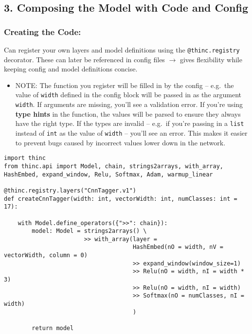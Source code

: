 \documentclass[
]{article}
\providecommand{\tightlist}{%
  \setlength{\itemsep}{0pt}\setlength{\parskip}{0pt}}
\begin{document}
\hypertarget{composing-the-model-with-code-and-config}{%
\subsection{3. Composing the Model with Code and
Config}\label{composing-the-model-with-code-and-config}}

\hypertarget{creating-the-code}{%
\subsubsection{Creating the Code:}\label{creating-the-code}}

Can register your own layers and model definitions using the
\texttt{@thinc.registry} decorator. These can later be
referenced in config files \(\rightarrow\) gives flexibility while
keeping config and model definitions concise.

\begin{itemize}
\tightlist
\item
  NOTE: The function you register will be filled in by the config --
  e.g.~the value of \texttt{width} defined in the config
  block will be passed in as the argument \texttt{width}.
  If arguments are missing, you'll see a validation error. If you're
  using \textbf{type hints} in the function, the values will be parsed
  to ensure they always have the right type. If the types are invalid --
  e.g.~if you're passing in a \texttt{list} instead of
  \texttt{int} as the value of
  \texttt{width} -- you'll see an error. This makes it
  easier to prevent bugs caused by incorrect values lower down in the
  network.
\end{itemize}

\begin{verbatim}
import thinc
from thinc.api import Model, chain, strings2arrays, with_array, HashEmbed, expand_window, Relu, Softmax, Adam, warmup_linear

@thinc.registry.layers("CnnTagger.v1")
def createCnnTagger(width: int, vectorWidth: int, numClasses: int = 17):

    with Model.define_operators({">>": chain}):
        model: Model = strings2arrays() \
                       >> with_array(layer =
                                     HashEmbed(nO = width, nV = vectorWidth, column = 0)
                                     >> expand_window(window_size=1)
                                     >> Relu(nO = width, nI = width * 3)
                                     >> Relu(nO = width, nI = width)
                                     >> Softmax(nO = numClasses, nI = width)
                                     )

        return model
\end{verbatim}
\end{document}
